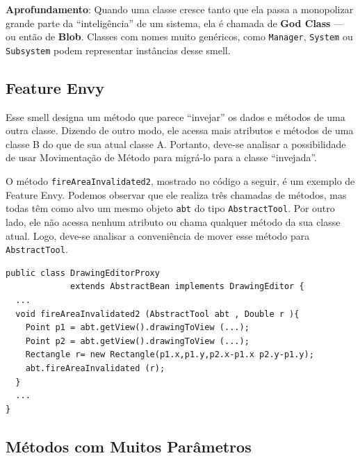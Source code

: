\documentclass[
  11pt,
  twoside]{book}
\newcommand{\passthrough}[1]{#1}
\newenvironment{esmbox}{\centering \vspace{1.5ex} \begin{tcolorbox}[breakable, colback=backcolor, width=4.9in]}{\end{tcolorbox} \vspace{1.5ex}}
\begin{document}
  

\begin{esmbox}

\textbf{Aprofundamento}: Quando uma classe cresce tanto que ela passa a
monopolizar grande parte da ``inteligência'' de um sistema, ela é
chamada de \textbf{God Class} --- ou então de \textbf{Blob}. Classes com
nomes muito genéricos, como \passthrough{\lstinline!Manager!},
\passthrough{\lstinline!System!} ou \passthrough{\lstinline!Subsystem!}
podem representar instâncias desse smell.

\end{esmbox}

\hypertarget{feature-envy}{%
\subsection{Feature Envy}\label{feature-envy}}

 

Esse smell designa um método que parece ``invejar'' os dados e métodos
de uma outra classe. Dizendo de outro modo, ele acessa mais atributos e
métodos de uma classe B do que de sua atual classe A. Portanto, deve-se
analisar a possibilidade de usar Movimentação de Método para migrá-lo
para a classe ``invejada''.

O método \passthrough{\lstinline!fireAreaInvalidated2!}, mostrado no
código a seguir, é um exemplo de Feature Envy. Podemos observar que ele
realiza três chamadas de métodos, mas todas têm como alvo um mesmo
objeto \passthrough{\lstinline!abt!} do tipo
\passthrough{\lstinline!AbstractTool!}. Por outro lado, ele não acessa
nenhum atributo ou chama qualquer método da sua classe atual. Logo,
deve-se analisar a conveniência de mover esse método para
\passthrough{\lstinline!AbstractTool!}.

\begin{lstlisting}
public class DrawingEditorProxy 
             extends AbstractBean implements DrawingEditor {
  ...
  void fireAreaInvalidated2 (AbstractTool abt , Double r ){
    Point p1 = abt.getView().drawingToView (...);
    Point p2 = abt.getView().drawingToView (...);
    Rectangle r= new Rectangle(p1.x,p1.y,p2.x-p1.x p2.y-p1.y);
    abt.fireAreaInvalidated (r);
  }
  ...
}
\end{lstlisting}

\hypertarget{muxe9todos-com-muitos-paruxe2metros}{%
\subsection{Métodos com Muitos
Parâmetros}\label{muxe9todos-com-muitos-paruxe2metros}}
\end{document}
